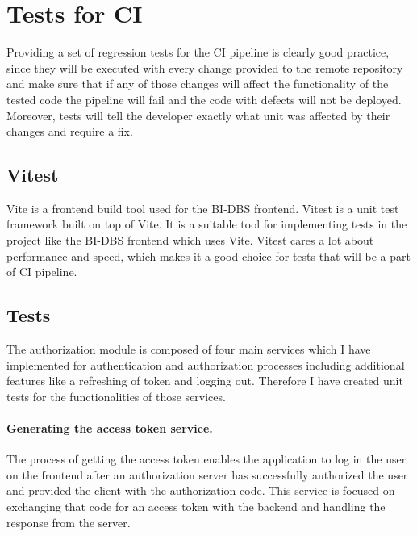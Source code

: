 \section{Tests for CI} Providing a set of regression tests for the CI pipeline is clearly good practice, since they will be executed with every change provided to the remote repository and make sure that if any of those changes will affect the functionality of the tested code the pipeline will fail and the code with defects will not be deployed. Moreover, tests will tell the developer exactly what unit was affected by their changes and require a fix.


\subsection{Vitest} Vite is a frontend build tool used for the BI-DBS frontend. Vitest is a unit test framework built on top of Vite. It is a suitable tool for implementing tests in the project like the BI-DBS frontend which uses Vite. Vitest cares a lot about performance and speed, which makes it a good choice for tests that will be a part of CI pipeline. \cite{vitest}

\subsection{Tests} The authorization module is composed of four main services which I have implemented for authentication and authorization processes including additional features like a refreshing of token and logging out. Therefore I have created unit tests for the functionalities of those services.\\


\paragraph*{Generating the access token service.} The process of getting the access token enables the application to log in the user on the frontend after an authorization server has successfully authorized the user and provided the client with the authorization code. This service is focused on exchanging that code for an access token with the backend and handling the response from the server.


